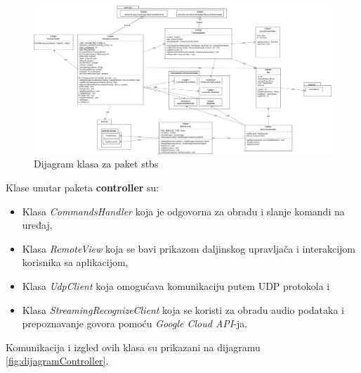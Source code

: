 \documentclass[implementacija.tex]{subfiles}
\begin{document}
\begin{figure}[!ht]
  \centering
  \includegraphics[width=\textwidth]{Implementacija/dijagrami/stbs_pakage_class_diagram.jpg}
  \caption{Dijagram klasa za paket stbs}
  \label{fig:dijagramStbs}
\end{figure}

Klase unutar paketa \textbf{controller} su:
\begin{itemize}
\item Klasa \textit{CommandsHandler} koja je odgovorna za obradu i slanje komandi na uređaj,
\item Klasa \textit{RemoteView} koja se bavi prikazom daljinskog upravljača i interakcijom korisnika sa aplikacijom,
\item Klasa \textit{UdpClient} koja omogućava komunikaciju putem UDP protokola i
\item Klasa \textit{StreamingRecognizeClient} koja se koristi za obradu audio podataka i prepoznavanje govora pomoću \textit{Google Cloud API}-ja. 
\end{itemize}
Komunikacija i izgled ovih klasa su prikazani na dijagramu \ref{fig:dijagramController}.
\end{document}
